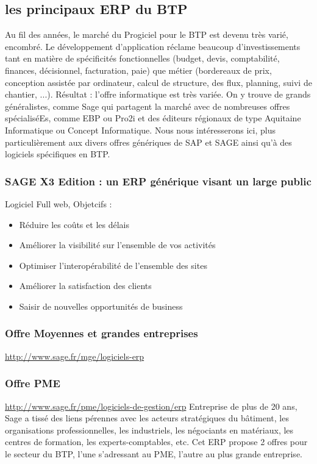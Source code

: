 		\subsection{les principaux ERP du BTP}
		Au fil des années, le marché du Progiciel pour le BTP est devenu très varié, encombré. 
Le développement d'application réclame beaucoup d'investissements tant en matière de spécificités fonctionnelles (budget, devis, comptabilité, finances, décisionnel, facturation, paie) que métier (bordereaux de prix, conception assistée par ordinateur, calcul de structure, des flux, planning, suivi de chantier, ...). 
Résultat : l'offre informatique est très variée. On y trouve de grands généralistes, comme Sage qui partagent la marché avec de nombreuses offres spécialiséEs, comme EBP ou Pro2i et des éditeurs régionaux de type Aquitaine Informatique ou Concept Informatique.
Nous nous intéresserons ici, plus particulièrement aux divers offres génériques de SAP et SAGE ainsi qu'à des logiciels spécifiques en BTP.
				\subsubsection{SAGE X3 Edition : un ERP générique visant un large public}
						Logiciel Full web,
						Objetcifs :
						\begin{itemize}
						    \item Réduire les coûts et les délais
						    \item Améliorer la visibilité sur l'ensemble de vos activités
							\item Optimiser l'interopérabilité de l'ensemble des sites
						    \item Améliorer la satisfaction des clients
							\item Saisir de nouvelles opportunités de business
						\end{itemize}

						\subsubsection{Offre Moyennes et grandes entreprises}
								\url{http://www.sage.fr/mge/logiciels-erp}
								\subsubsection{Offre PME}
								\url{http://www.sage.fr/pme/logiciels-de-gestion/erp}
						Entreprise de plus de 20 ans, Sage a tissé des liens pérennes avec les acteurs stratégiques du bâtiment, les organisations professionnelles, les industriels, 
            les négociants en matériaux, les centres de formation, les experts-comptables, etc. 
Cet ERP propose 2 offres pour le secteur du BTP, l'une s'adressant au PME, l'autre au plus grande entreprise.

